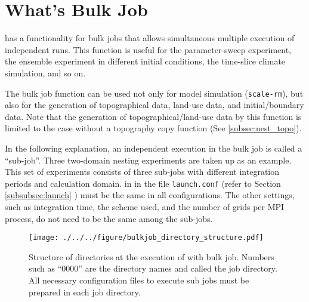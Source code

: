 
\section{What's Bulk Job} \label{sec:bulkjob}
 \scalerm has a functionality for bulk jobs that allows simultaneous multiple execution of independent runs.
This function is useful for the parameter-sweep experiment, the ensemble experiment in different initial conditions, the time-slice climate simulation, and so on.

The bulk job function can be used not only for model simulation (\verb|scale-rm|), but also for the generation of topographical data, land-use data, and initial/boundary data. Note that the generation of topographical/land-use data by this function is limited to the case without a topography copy function (See \ref{subsec:nest_topo}).

In the following explanation, an independent execution in the bulk job is called a ``sub-job''.
Three two-domain nesting experiments are taken up as an example.
This set of experiments consists of three sub-jobs with different integration periods and calculation domain.
 in  in the file \verb|launch.conf| (refer to Section \ref{subsubsec:launch} ) must be the same in all configurations.
The other settings, such as integration time, the scheme used, and the number of grids per MPI process, do not need to be the same among the sub-jobs.

\begin{figure}[t]
\begin{center}
  \texttt{[image: ./../../figure/bulkjob\_directory\_structure.pdf]}\\
  \caption{Structure of directories at the execution of \scalerm with bulk job.
Numbers such as ``0000'' are the directory names and called the job directory.   All necessary configuration files to execute sub jobs must be prepared in each job directory.
}
  \label{fig_bulkjob}
\end{center}
\end{figure}



